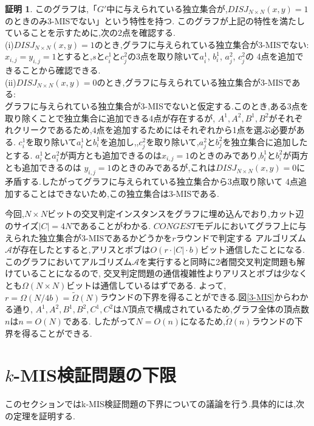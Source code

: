 \documentclass[12pt]{thesis}
\theoremstyle{definition}
\newtheorem*{prf*}{証明}
\begin{document}
\begin{prf*}
このグラフは,「$G'$中に与えられている独立集合が,$DISJ_{N \times N} (x, y) = 1$のときのみ3-MISでない」という特性を持つ. 
このグラフが上記の特性を満たしていることを示すために,次の2点を確認する. \\
(i)$DISJ_{N \times N} (x, y) = 1$のとき,グラフに与えられている独立集合が3-MISでない: \\
$x_{i, j} = y_{i, j} =1$とすると,$s$と$c_{i}^{1}$と$c_{j}^{2}$の3点を取り除いて$a_{i}^{1}$, $b_{i}^{1}$, $a_{j}^{2}$, $c_{j}^{2}$の
4点を追加できることから確認できる. \\
(ii)$DISJ_{N \times N} (x, y) = 0$のとき,グラフに与えられている独立集合が3-MISである: \\ 
グラフに与えられている独立集合が3-MISでないと仮定する.このとき,ある3点を取り除くことで独立集合に追加できる4点が存在するが,
$A^{1}, A^{2}, B^{1}, B^{2}$がそれぞれクリークであるため,4点を追加するためにはそれぞれから1点を選ぶ必要がある.
$c_{i}^{1}$を取り除いて$a_{i}^{1}$と$b_{i}^{1}$を追加し,,$c_{j}^{2}$を取り除いて,$a_{j}^{2}$と$b_{j}^{2}$を独立集合に追加したとする.
$a_{i}^{1}$と$a_{i}^{2}$が両方とも追加できるのは$x_{i, j} = 1$のときのみであり,$b_{i}^{1}$と$b_{i}^{2}$が両方とも追加できるのは
$y_{i, j} = 1$のときのみであるが,これは$DISJ_{N \times N} (x, y) = 0$に矛盾する.したがってグラフに与えられている独立集合から3点取り除いて
4点追加することはできないため,この独立集合は3-MISである.

今回,$N \times N$ビットの交叉判定インスタンスをグラフに埋め込んでおり,カット辺のサイズ$|C| = 4N$であることがわかる.
$CONGEST$モデルにおいてグラフ上に与えられた独立集合が3-MISであるかどうかを$r$ラウンドで判定する
アルゴリズム$\mathcal{A}$が存在したとすると,アリスとボブは$O(r \cdot |C| \cdot b)$ビット通信したことになる.
このグラフにおいてアルゴリズム$\mathcal{A}$を実行すると同時に2者間交叉判定問題も解けていることになるので,
交叉判定問題の通信複雑性よりアリスとボブは少なくとも$\Omega (N \times N)$ビットは通信しているはずである.
よって,$r = \Omega (N / 4b) = \tilde{\Omega}(N)$ラウンドの下界を得ることができる.図\ref{3-MIS}からわかる通り,
$A^{1}, A^{2}, B^{1}, B^{2}, C^{1}, C^{2}$は$N$頂点で構成されているため,グラフ全体の頂点数$n$は$n = O(N)$である.
したがって$N = O(n)$になるため,$\tilde{\Omega}(n)$ラウンドの下界を得ることができる. 
\end{prf*}
\newpage

\section{$k$-MIS検証問題の下限}
このセクションではk-MIS検証問題の下界についての議論を行う.具体的には,次の定理を証明する.
\end{document}
